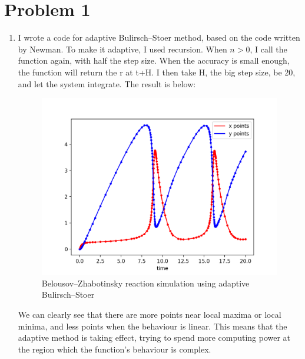\documentclass[12pt,letterpaper]{article}
\begin{document}
\section*{Problem 1}

\begin{enumerate}
  \item
   I wrote a code for adaptive Bulirsch–Stoer method, based on the code written by Newman. To make it adaptive, I used recursion. When $n>0$, I call the function again, with half the step size. When the accuracy is small enough, the function  will return the r at t+H. I then take H, the big step size, be 20, and let the system integrate. The result is below:
   
   \begin{figure}[h]
    \centering
    \includegraphics[width=1.\linewidth]{fig1a.png}
    \caption{Belousov–Zhabotinsky reaction simulation using adaptive Bulirsch–Stoer}
    \end{figure}
    We can clearly see that there are more points near local maxima or local minima, and less points when the behaviour is linear. This means that the adaptive method is taking effect, trying to spend more computing power at the region which the function's behaviour is complex.
    \clearpage
\end{enumerate}
\end{document}
